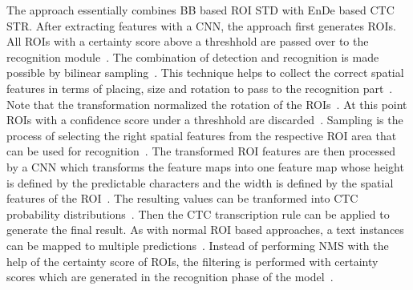 The approach essentially combines \ac{BB} based \ac{ROI} \ac{STD} with \ac{EnDe} based \ac{CTC}
\ac{STR}.
After extracting features with a \ac{CNN}, the approach first generates \acp{ROI}.
All \acp{ROI} with a certainty score above a threshhold are passed over to the recognition
module~\citep{busta_deep_2017}.
The combination of detection and recognition is made possible by bilinear
sampling~\citep{busta_deep_2017}.
This technique helps to collect the correct spatial features in terms of placing, size and rotation
to pass to the recognition part~\citep{busta_deep_2017}.
Note that the transformation normalized the rotation of the \acp{ROI}~\citep{busta_deep_2017}.
At this point \acp{ROI} with a confidence score under a threshhold are
discarded~\citep{busta_deep_2017}.
Sampling is the process of selecting the right spatial features from the respective \ac{ROI} area
that can be used for recognition~\citep{liu_abcnet_2020}.
The transformed \ac{ROI} features are then processed by a \ac{CNN} which transforms the feature maps
into one feature map whose height is defined by the predictable characters and the width is defined
by the spatial features of the \ac{ROI}~\citep{busta_deep_2017}.
The resulting values can be tranformed into \ac{CTC} probability
distributions~\citep{busta_deep_2017,graves_connectionist_2006}.
Then the \ac{CTC} transcription rule can be applied to generate the final result.
As with normal \ac{ROI} based approaches, a text instances can be mapped to multiple
predictions~\citep{ren_faster_2016,busta_deep_2017}.
Instead of performing \ac{NMS} with the help of the certainty score of \acp{ROI}, the filtering
is performed with certainty scores which are generated in the recognition phase of the
model~\citep{busta_deep_2017}.

